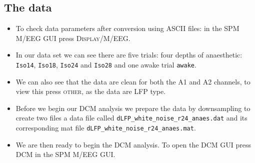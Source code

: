 \subsection{The data}

\begin{itemize}
\item To check data parameters after conversion using ASCII files: in the SPM M/EEG GUI press \textsc{Display/M/EEG}.
\item In our data set we can see there are five trials: four depths of anaesthetic: \texttt{Iso14}, \texttt{Iso18}, \texttt{Iso24} and \texttt{Iso28} and one awake trial \texttt{awake}.
\item We can also see that the data are clean for both the A1 and A2 channels, to view this press \textsc{other}, as the data are LFP type.
\item Before we begin our DCM analysis we prepare the data by downsampling  to create two files a data file called \texttt{dLFP\_white\_noise\_r24\_anaes.dat} and its corresponding mat file \texttt{dLFP\_white\_noise\_r24\_anaes.mat}.
\item We are then ready to begin the DCM analysis. To open the DCM GUI press \textsc{DCM} in the SPM M/EEG GUI.
\end{itemize}

